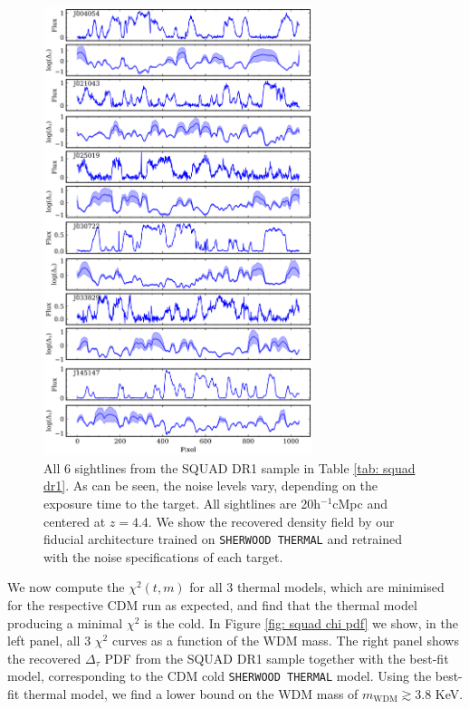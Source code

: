 \begin{figure}
    \centering
    \includegraphics[width=0.7\textwidth]{img/ML/SQUAD_pred.png}
    \caption{All 6 sightlines from the SQUAD DR1 sample in Table \ref{tab: squad dr1}. As can be seen, the noise levels vary, depending on the exposure time to the target. All sightlines are 20h$^{-1}$cMpc and centered at $z=4.4$. We show the recovered density field by our fiducial architecture trained on \texttt{SHERWOOD THERMAL} and retrained with the noise specifications of each target.}
    \label{fig: squad pred}
\end{figure}

We now compute the $\chi^2(t,m)$ for all 3 thermal models, which are minimised for the respective CDM run as expected, and find that the thermal model producing a minimal $\chi^2$ is the cold. In Figure \ref{fig: squad chi pdf} we show, in the left panel, all 3 $\chi^2$ curves as a function of the WDM mass. The right panel shows the recovered $\Delta_\tau$ PDF from the SQUAD DR1 sample together with the best-fit model, corresponding to the CDM cold \texttt{SHERWOOD THERMAL} model. Using the best-fit thermal model, we find a lower bound on the WDM mass of $m_{\mathrm{WDM}} \gtrsim 3.8$ KeV.


